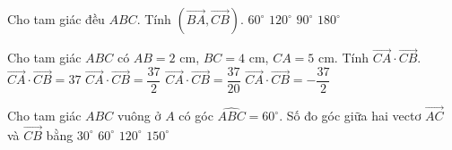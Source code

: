 \begin{ex}%
	Cho tam  giác đều $ABC$. Tính $\left(\overrightarrow{BA}, \overrightarrow{CB}\right)$.
	\choice 
		 {$60^{\circ}$}
		{\True  $120^{\circ}$}
		 {$90^{\circ}$}
		{$180^{\circ}$} 
\end{ex}

\begin{ex}%
	Cho tam giác $ABC$ có $AB=2$ cm, $BC=4$ cm, $CA=5$  cm. Tính $\overrightarrow{CA}\cdot\overrightarrow{CB}$.
	\choice 
		{$\overrightarrow{CA}\cdot\overrightarrow{CB}=37$} 
		{\True $\overrightarrow{CA}\cdot \overrightarrow{CB}=\dfrac{37}{2}$} 
		{ $\overrightarrow{CA}\cdot  \overrightarrow{CB}=\dfrac{37}{20}$}
		 {$\overrightarrow{CA}\cdot \overrightarrow{CB}=-\dfrac{37}{2}$}
\end{ex}

\begin{ex}%
	Cho tam giác $ABC$ vuông ở  $A$ có góc $\widehat{ABC}=60^{\circ}$. Số đo góc giữa hai vectơ $\overrightarrow{AC}$ và $\overrightarrow{CB}$ bằng
	 \choice
		{$30^{\circ}$} 
		{$60^{\circ}$} 
		{$120^{\circ}$} 
		{\True  $150^{\circ}$}
\end{ex}

